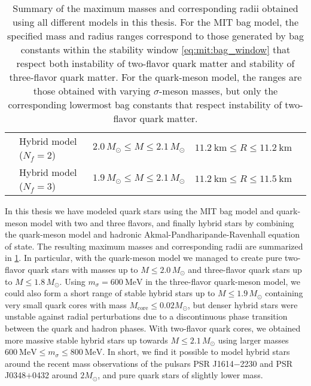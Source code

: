 \begin{table}
{\begin{tabular}{ l l c c c }
	\Cref{chap:hybrid} & Hybrid model ($N_f=2$) & $2.0 \, M_\odot \leq M \leq 2.1 \, M_\odot$ & $\SI{11.2}{\kilo\meter} \leq R \leq \SI{11.2}{\kilo\meter}$ \\
	\Cref{chap:hybrid} & Hybrid model ($N_f=3$) & $1.9 \, M_\odot \leq M \leq 2.1 \, M_\odot$ & $\SI{11.2}{\kilo\meter} \leq R \leq \SI{11.5}{\kilo\meter}$ \\
	\bottomrule
\end{tabular}}
\caption{\label{tab:master_conclusion:results}%
Summary of the maximum masses and corresponding radii obtained using all different models in this thesis.
For the MIT bag model, the specified mass and radius ranges correspond to those generated by bag constants within the stability window \eqref{eq:mit:bag_window}
that respect both instability of two-flavor quark matter and stability of three-flavor quark matter.
For the quark-meson model, the ranges are those obtained with varying $\sigma$-meson masses, but only the corresponding lowermost bag constants that respect instability of two-flavor quark matter.
}
\end{table}

In this thesis we have modeled quark stars using the MIT bag model and quark-meson model with two and three flavors,
and finally hybrid stars by combining the quark-meson model and hadronic Akmal-Pandharipande-Ravenhall equation of state.
The resulting maximum masses and corresponding radii are summarized in \cref{tab:master_conclusion:results}.
In particular, with the quark-meson model we managed to create pure two-flavor quark stars with masses up to $M \leq 2.0 \, M_\odot$ and three-flavor quark stars up to $M \leq 1.8 \, M_\odot$.
Using $m_\sigma = \SI{600}{\mega\electronvolt}$ in the three-flavor quark-meson model,
we could also form a short range of stable hybrid stars up to $M \leq 1.9 \, M_\odot$ containing very small quark cores with mass $M_\text{core} \leq 0.02 M_\odot$,
but denser hybrid stars were unstable against radial perturbations due to a discontinuous phase transition between the quark and hadron phases.
With two-flavor quark cores,
we obtained more massive stable hybrid stars up towards $M \leq 2.1 \, M_\odot$ using larger masses $\SI{600}{\mega\electronvolt} \leq m_\sigma \leq \SI{800}{\mega\electronvolt}$.
In short, we find it possible to model hybrid stars around the recent mass observations of the pulsars PSR J1614$-$2230 and PSR J0348$+$0432 around $2 M_\odot$,
and pure quark stars of slightly lower mass.

